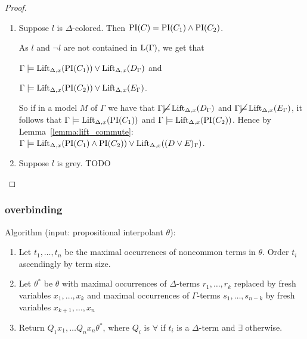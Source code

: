 \begin{proof}
\begin{itemize}
\begin{enumerate}
					\item Suppose $l$ is $\Delta$-colored.
						Then $\PI(C) = \PI(C_1) \land \PI(C_2)$.

						As $l$ and $\lnot l$ are not contained in $\Lang(\Gamma)$, we get that 

						$\Gamma \entails \lift{\Delta}{ \PI(C_1) }{x} \lor
						\lift{\Delta}{ D_\Gamma }{x}$
						and

						$\Gamma \entails \lift{\Delta}{ \PI(C_2) }{x} \lor
						\lift{\Delta}{ E_\Gamma }{x}$.

						So if in a model $M$ of $\Gamma$ we have that
						$\Gamma \cancel\entails \lift{\Delta}{ D_\Gamma }{x}$ and 
						$\Gamma \cancel\entails \lift{\Delta}{ E_\Gamma }{x}$, it follows that $\Gamma \entails \lift{\Delta}{ \PI(C_1) }{x}$ and $\Gamma \entails \lift{\Delta}{ \PI(C_2) }{x}$. Hence by Lemma~\ref{lemma:lift_commute}:
						$\Gamma \entails \lift{\Delta}{ \PI(C_1) \land \PI(C_2) }{x} \lor
						\lift{\Delta}{ (D \lor E)_\Gamma }{x}$.

					\item Suppose $l$ is grey. TODO

			\end{enumerate}


	\end{itemize}


\end{proof}

\clearpage







	\subsubsection{overbinding}

	Algorithm (input: propositional interpolant $\theta$):
	\begin{enumerate}
		\item Let $t_1, \ldots, t_n$ be the maximal occurrences of noncommon terms in $\theta$. Order $t_i$ ascendingly by term size. 
		\item Let $\theta^*$ be $\theta$ with maximal occurrences of $\Delta$-terms $r_1, \ldots, r_k$ replaced by fresh variables $x_1, \ldots, x_k$ and maximal occurrences of $\Gamma$-terms $s_1, \ldots, s_{n-k}$ by fresh variables $x_{k+1}, \ldots, x_{n}$
		\item Return $Q_1 x_1, \ldots Q_n x_n \theta^*$, where $Q_i$ is $\forall$ if $t_i$ is a $\Delta$-term and $\exists$ otherwise.
	\end{enumerate}

